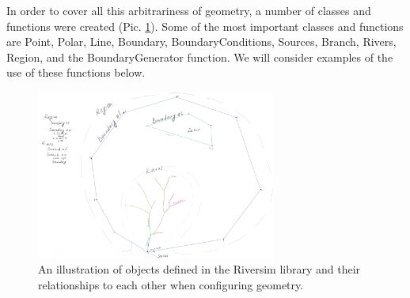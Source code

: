 \documentclass[]{pracamgr}
\begin{document}
      In order to cover all this arbitrariness of geometry, a number of classes and functions were created (Pic. \ref{GeometryClasses}). Some of the most important classes and functions are Point, Polar, Line, Boundary, BoundaryConditions, Sources, Branch, Rivers, Region, and the BoundaryGenerator function. We will consider examples of the use of these functions below.
      
      \begin{figure}[H]
        \centering
        \includegraphics[width=0.7\textwidth]{figs/GeometryClasses.png}
        \caption{An illustration of objects defined in the Riversim library and their relationships to each other when configuring geometry.}
        \label{GeometryClasses}
      \end{figure}
\end{document}
